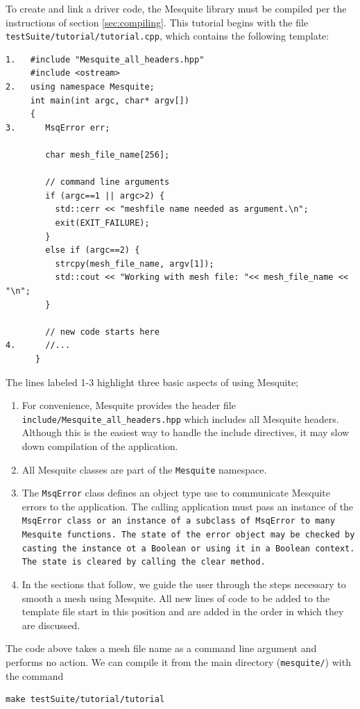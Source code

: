 To create and link a driver code, the Mesquite library must be
compiled per the instructions of section \ref{sec:compiling}. 
This tutorial begins with the file \newline
\texttt{testSuite/tutorial/tutorial.cpp}, 
which contains the following template:
\begin{verbatim}
1.   #include "Mesquite_all_headers.hpp"
     #include <ostream>
2.   using namespace Mesquite;
     int main(int argc, char* argv[])
     {
3.      MsqError err;
  
        char mesh_file_name[256];
  
        // command line arguments
        if (argc==1 || argc>2) {
          std::cerr << "meshfile name needed as argument.\n";
          exit(EXIT_FAILURE);
        }
        else if (argc==2) {
          strcpy(mesh_file_name, argv[1]);
          std::cout << "Working with mesh file: "<< mesh_file_name << "\n";
        } 

        // new code starts here
4.      //... 
      }
\end{verbatim}
The lines labeled 1-3 highlight three basic aspects of using Mesquite;
\begin{enumerate}
\item For convenience, Mesquite provides the header file
\texttt{include/Mesquite\_all\_headers.hpp} which includes all Mesquite
headers. Although this is the easiest way to handle the include directives,
it may slow down compilation of the application.  
\item All Mesquite classes are part of the \texttt{Mesquite} namespace. 

\item  The \texttt{MsqError} class defines an object type use to communicate
Mesquite errors to the application.  The calling application must pass
an instance of the \tt{MsqError} class or an instance of a subclass of
\tt{MsqError} to many Mesquite functions.  The state of the error object
may be checked by casting the instance ot a Boolean or using it in a 
Boolean context.  The state is cleared by calling the \tt{clear} method.
\item In the sections that follow, we guide the user through the steps
necessary to smooth a mesh using Mesquite.  All new lines of code to be
added to the template file start in this position and are added in the order
in which they are discussed.
\end{enumerate}

The code above takes a mesh file name as a command line argument and
performs no action. We can compile it from the main directory
(\texttt{mesquite/}) with the command 
\begin{verbatim}
make testSuite/tutorial/tutorial
\end{verbatim}

